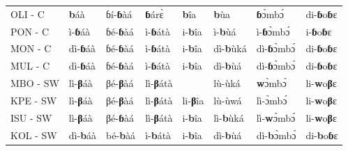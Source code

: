 \documentclass[output=paper,colorlinks,citecolor=brown
]{langscibook}
\begin{document}
\begin{table}
{\begin{tabular}{llllllll}
OLI - C                   & \textbf{b}áà                      & ɓí-\textbf{ɓ}àá                                                 & \textbf{ɓ}árɛ̀                & \textbf{b}îa                    & \textbf{b}ùa                   & \textbf{ɓ}ɔ̀mbɔ́                & di-\textbf{ɓ}o\textbf{ɓ}ɛ                  \\
PON - C                   & ì-\textbf{ɓ}áà                   & ɓé-\textbf{ɓ}àá                                                 & ì-\textbf{ɓ}átà             & i-\textbf{b}îa                  & ì-\textbf{b}ùá               & ì-\textbf{ɓ}ɔ̀mbɔ́             & i-\textbf{ɓ}o\textbf{ɓ}ɛ                   \\
MON - C                   & dì-\textbf{ɓ}áà                  & ɓé-\textbf{ɓ}àá                                                 & ì-\textbf{ɓ}átà             & i-\textbf{b}îa                  & dì-\textbf{b}ùká             & dì-\textbf{ɓ}ɔ̀mbɔ́            & di-\textbf{ɓ}o\textbf{ɓ}ɛ                  \\
MUL - C                   & dì-\textbf{ɓ}áà                  & ɓé-\textbf{ɓ}àá                                                 & ì-\textbf{ɓ}átà             & i-\textbf{b}îa                  & dì-\textbf{b}ùá              & dì-\textbf{ɓ}ɔ̀mbɔ́            & di-\textbf{ɓ}o\textbf{ɓ}ɛ                  \\
MBO - SW                  & lì-\textbf{β}áà                  & βé-\textbf{β}àá                                                 & lì-\textbf{β}átà            &                        & lù-ùká              & \textbf{w}ɔ̀mbɔ́                & li-\textbf{w}o\textbf{β}ɛ                  \\
KPE - SW                  & lì-\textbf{β}áà                  & βé-\textbf{β}àá                                                 & lì-\textbf{β}átà            & li-\textbf{β}îa                & lù-ùwá              & lì-ɔ̀mbɔ́             & li-\textbf{w}o\textbf{β}ɛ                  \\
ISU - SW                  & lì-\textbf{β}áà                  & βé-\textbf{ɓ}àá                                                 & lì-\textbf{β}átà            & i-\textbf{b}îa                  & lì-\textbf{b}ùká             & lì-\textbf{w}ɔ̀mbɔ́            & li-\textbf{w}o\textbf{β}ɛ                  \\
KOL - SW                  & dì-\textbf{b}áà                  & bé-\textbf{b}àá                                                 & ì-\textbf{b}átà             & i-\textbf{b}îa                  & dì-\textbf{b}ùá              & dì-\textbf{b}ɔ̀mbɔ́            & di-\textbf{b}o\textbf{ɓ}ɛ                  \\

\end{tabular}}
\end{table}
\end{document}
